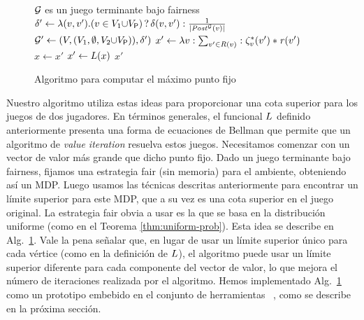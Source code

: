 \begin{figure}
    \centering
    \begin{minipage}{0.75\textwidth}
      \begin{algorithm}[H]
      \SetAlgoLined
      \KwOut{$\nu \Bellman$}
        \caption{Algoritmo para computar el máximo punto fijo}\label{Alg:gfp}
        \begin{algorithmic}
          \REQUIRE $\mathcal{G}$ es un juego terminante bajo fairness\\[1ex]
          \STATE $\delta' \gets  \lambda (v,v') {.} (v \in V_1 {\cup} V_{\mathsf{P}}) \mathop{?} \delta(v,v') : \frac{1}{|\mathit{Post}^{\mathcal{G}}(v)|}$\\[-1ex]
          \STATE  $\mathcal{G}' \gets (V, (V_1, \emptyset, V_2{\cup}V_{\mathsf{P}})), \delta')$
          \STATE $x' \gets \lambda v : \sum_{v' \in R(v)} : \zeta^*_v(v')*\mathit{r}(v')$
          \REPEAT
          \STATE $x \gets x'$
          \STATE $x' \gets L(x)$
          \RETURN $x'$
        \end{algorithmic}
      \end{algorithm}
    \end{minipage}
  \end{figure}
    Nuestro algoritmo utiliza estas ideas para proporcionar una cota superior para los juegos de dos jugadores. En términos generales, el funcional $L$ definido anteriormente presenta una forma de ecuaciones de Bellman que permite que un algoritmo de \emph{value iteration} resuelva estos juegos. Necesitamos comenzar con un vector de valor más grande que dicho punto fijo. Dado un juego terminante bajo fairness, fijamos una estrategia fair (sin memoria) para el ambiente, obteniendo así un MDP. Luego usamos las técnicas descritas anteriormente para encontrar un límite superior para este MDP, que a su vez es una cota superior en el juego original. La estrategia fair obvia a usar es la que se basa en la distribución uniforme (como en el Teorema \ref{thm:uniform-prob}). Esta idea se describe en Alg.~\ref{Alg:gfp}. Vale la pena señalar que, en lugar de usar un límite superior único para cada vértice (como en la definición de $L$), el algoritmo puede usar un límite superior diferente para cada componente del vector de valor, lo que mejora el número de iteraciones realizada por el algoritmo.
Hemos implementado Alg.~\ref{Alg:gfp} como un prototipo embebido en el conjunto de herramientas {\PrismGames} ~\cite{DBLP:conf/cav/KwiatkowskaN0S20}, 
como se describe en la próxima sección. 


